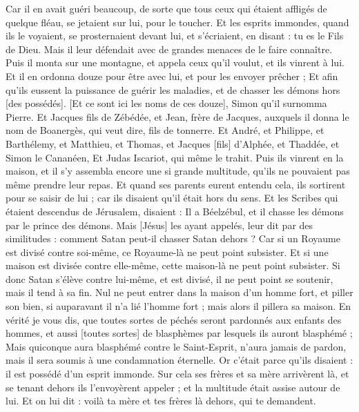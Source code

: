 \begin{multicols}{2}
Car il en avait guéri beaucoup, de sorte que tous ceux qui étaient affligés de quelque fléau, se jetaient sur lui, pour le toucher.
Et les esprits immondes, quand ils le voyaient, se prosternaient devant lui, et s'écriaient, en disant : tu es le Fils de Dieu.
Mais il leur défendait avec de grandes menaces de le faire connaître.
Puis il monta sur une montagne, et appela ceux qu'il voulut, et ils vinrent à lui.
Et il en ordonna douze pour être avec lui, et pour les envoyer prêcher ;
Et afin qu'ils eussent la puissance de guérir les maladies, et de chasser les démons hors [des possédés].
[Et ce sont ici les noms de ces douze], Simon qu'il surnomma Pierre.
Et Jacques fils de Zébédée, et Jean, frère de Jacques, auxquels il donna le nom de Boanergès, qui veut dire, fils de tonnerre.
Et André, et Philippe, et Barthélemy, et Matthieu, et Thomas, et Jacques [fils] d'Alphée, et Thaddée, et Simon le Cananéen,
Et Judas Iscariot, qui même le trahit.
Puis ils vinrent en la maison, et il s'y assembla encore une si grande multitude, qu'ils ne pouvaient pas même prendre leur repas.
Et quand ses parents eurent entendu cela, ils sortirent pour se saisir de lui ; car ils disaient qu'il était hors du sens.
Et les Scribes qui étaient descendus de Jérusalem, disaient : Il a Béelzébul, et il chasse les démons par le prince des démons.
Mais [Jésus] les ayant appelés, leur dit par des similitudes : comment Satan peut-il chasser Satan dehors ?
Car si un Royaume est divisé contre soi-même, ce Royaume-là ne peut point subsister.
Et si une maison est divisée contre elle-même, cette maison-là ne peut point subsister.
Si donc Satan s'élève contre lui-même, et est divisé, il ne peut point se soutenir, mais il tend à sa fin.
Nul ne peut entrer dans la maison d'un homme fort, et piller son bien, si auparavant il n'a lié l'homme fort ; mais alors il pillera sa maison.
En vérité je vous dis, que toutes sortes de péchés seront pardonnés aux enfants des hommes, et aussi [toutes sortes] de blasphèmes par lesquels ils auront blasphémé ;
Mais quiconque aura blasphémé contre le Saint-Esprit, n'aura jamais de pardon, mais il sera soumis à une condamnation éternelle.
Or c'était parce qu'ils disaient : il est possédé d'un esprit immonde.
Sur cela ses frères et sa mère arrivèrent là, et se tenant dehors ils l'envoyèrent appeler ; et la multitude était assise autour de lui.
Et on lui dit : voilà ta mère et tes frères là dehors, qui te demandent.

\end{multicols}
